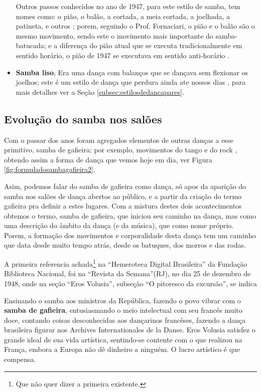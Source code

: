 \begin{itemize}
Outros passos conhecidos no ano de 1947, para este estilo de samba, tem nomes como: 
o pião, o balão, a cortada, a meia cortada, a joelhada, a patineta, e outros \cite[pp. 66]{fornaciari1947aprender};
porem, seguindo o Prof. Fornaciari, o pião e o balão são o mesmo movimento, 
sendo este o movimento mais importante do samba-batucada;
e a diferença do pião atual que se executa tradicionalmente em sentido horário,
o pião de 1947 se executava em sentido anti-horário \cite[pp. 68,72]{fornaciari1947aprender}.




\item \textbf{Samba liso}, 
Era uma dança com balanços que se dançava sem flexionar os joelhos;
este é um estilo de dança que perdura ainda ate nossos 
dias \cite[pp. 58,62]{freitas1959danca} \cite[pp. 143]{perna2002samba}, 
para mais detalhes ver a Seção \ref{subsec:estilosdedancapares}.
\end{itemize}

\subsection{Evolução do samba nos salões}

Com o passar dos anos foram agregados elementos de outras danças a esse primitivo, samba de gafieira;
por exemplo, movimentos do tango e do rock \cite[pp. 142]{perna2002samba}, 
obtendo assim a forma de dança que vemos hoje em dia, ver Figura \ref{fig:formuladosambagafieira2}.

Asim, podemos falar do samba de gafieira como dança, só apos da aparição do samba nos
salões de dança abertos ao público, e a partir da criação do termo gafieira pra definir a estes lugares.
Com a mistura destes dois acontecimentos obtemos o termo, samba de gafieira,
que iniciou seu caminho na dança, mas como uma descrição do âmbito da dança (e da música), que como nome próprio.
Porem, a formação dos movimentos e corporalidade desta dança tem um caminho que data desde muito tempo atrás,
desde os batuques, dos morros e das rodas.


A primeira referencia achada\footnote{Que não quer dizer a primeira existente.} 
na ``Hemeroteca Digital Brasileira'' da Fundação Biblioteca Nacional,
foi na ``Revista da Semana''(RJ), no dia 25 de dezembro de 1948,
onde na seção ``Eros Volusia'', subseção ``O pitoresco da excursão'', se indica \cite[pp. 48]{sambagafieirarefbn}
\begin{citando}
Ensinando o samba aos ministros da República, 
fazendo o povo vibrar com o \textbf{samba de gafieira}, entusiasmando
o meio intelectual com seu francês muito doce,
contando coisas desconhecidas aos dançarinos francêses,
fazendo a dança brasileira figurar nos Archives Internationales de la Danse.
Eros Volusia satisfez o grande ideal de sua vida artística, sentindo-se contente
com o que realizou na França, embora a Europa não dê dinheiro a ninguém.
O lucro artístico é que compensa.
\end{citando}


